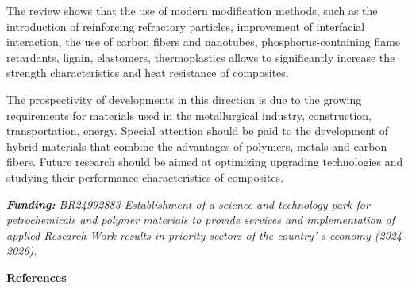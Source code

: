 \begin{multicols}{2}
The review shows that the use of modern modification methods, such as
the introduction of reinforcing refractory particles, improvement of
interfacial interaction, the use of carbon fibers and nanotubes,
phosphorus-containing flame retardants, lignin, elastomers,
thermoplastics allows to significantly increase the strength
characteristics and heat resistance of composites.

The prospectivity of developments in this direction is due to the
growing requirements for materials used in the metallurgical industry,
construction, transportation, energy. Special attention should be paid
to the development of hybrid materials that combine the advantages of
polymers, metals and carbon fibers. Future research should be aimed at
optimizing upgrading technologies and studying their performance
characteristics of composites.

\emph{{\bfseries Funding:} BR24992883 Establishment of a science and
technology park for petrochemicals and polymer materials to provide
services and implementation of applied Research Work results in priority
sectors of the country' s economy (2024-2026).}
\end{multicols}

\begin{center}
{\bfseries References}
\end{center}


